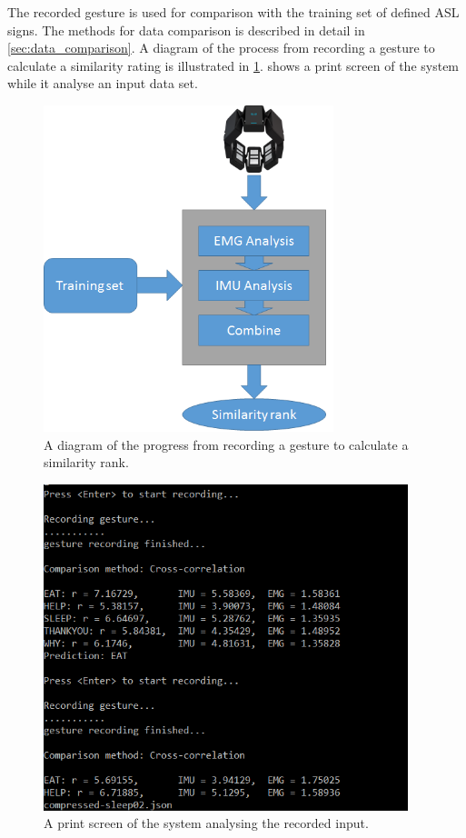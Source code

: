 The recorded gesture is used for comparison with the training set of defined ASL signs. The methods for data comparison is described in detail in \cref{sec:data_comparison}. A diagram of the process from recording a gesture to calculate a similarity rating is illustrated in \cref{fig:gesture_process_diagram}.  shows a print screen of the system while it analyse an input data set.

\begin{figure}[ht]
    \centering
    \includegraphics[height=9.5cm]{content/05-Methodology/images/Process_diagram.png}
    \caption[Process Diagram]{A diagram of the progress from recording a gesture to calculate a similarity rank.}
    \label{fig:gesture_process_diagram}
\end{figure}

\begin{figure}[ht]
    \centering
    \includegraphics[height=9.5cm]{content/05-Methodology/images/recording.png}
    \caption[Gesture Recording]{A print screen of the system analysing the recorded input.}
    \label{fig:recording_printscreen}
\end{figure}


